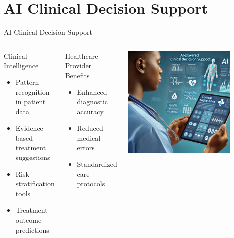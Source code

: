 \documentclass[aspectratio=169]{beamer}
\begin{document}
\section{AI Clinical Decision Support}
\begin{frame}{AI Clinical Decision Support}
    \begin{columns}[T]
            \begin{block}{Clinical Intelligence}
                \begin{itemize}
                    \item Pattern recognition in patient data
                    \item Evidence-based treatment suggestions
                    \item Risk stratification tools
                    \item Treatment outcome predictions
                \end{itemize}
            \end{block}
            
            \begin{alertblock}{Healthcare Provider Benefits}
                \begin{itemize}
                    \item Enhanced diagnostic accuracy
                    \item Reduced medical errors
                    \item Standardized care protocols
                \end{itemize}
            \end{alertblock}
            \includegraphics[width=0.8\textwidth]{ai_clinical_illustration.png}
    \end{columns}
\end{frame}
\end{document}
